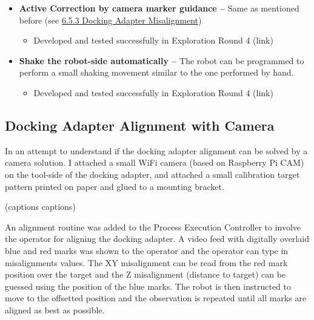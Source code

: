 {\begin{itemize}
\begin{itemize}
	\item Tested with success (link) but only in combination with the camera correction method.

\end{itemize}
	\item \textbf{Active Correction by camera marker guidance --} Same as mentioned before (see \ul{6.5.3 Docking Adapter Misalignment})

\begin{itemize}
	\item Developed and tested successfully in Exploration Round 4 (link)

\end{itemize}
	\item \textbf{Shake the robot-side automatically --} The robot can be programmed to perform a small shaking movement similar to the one performed by hand.

\begin{itemize}
	\item Developed and tested successfully in Exploration Round 4 (link)

\end{itemize}
\end{itemize}

\subsection{Docking Adapter Alignment with Camera}
\label{subsection:exploration_3_docking_adapter_alignment_with_camera}

In an attempt to understand if the docking adapter alignment can be solved by a camera solution. I attached a small WiFi camera (based on Raspberry Pi CAM) on the tool-side of the docking adapter, and attached a small calibration target pattern printed on paper and glued to a mounting bracket.







(captions captions)

An alignment routine was added to the Process Execution Controller to involve the operator for aligning the docking adapter. A video feed with digitally overlaid blue and red marks was shown to the operator and the operator can type in misalignments values. The XY misalignment can be read from the red mark position over the target and the Z misalignment (distance to target) can be guessed using the position of the blue marks. The robot is then instructed to move to the offsetted position and the observation is repeated until all marks are aligned as best as possible. 

}
